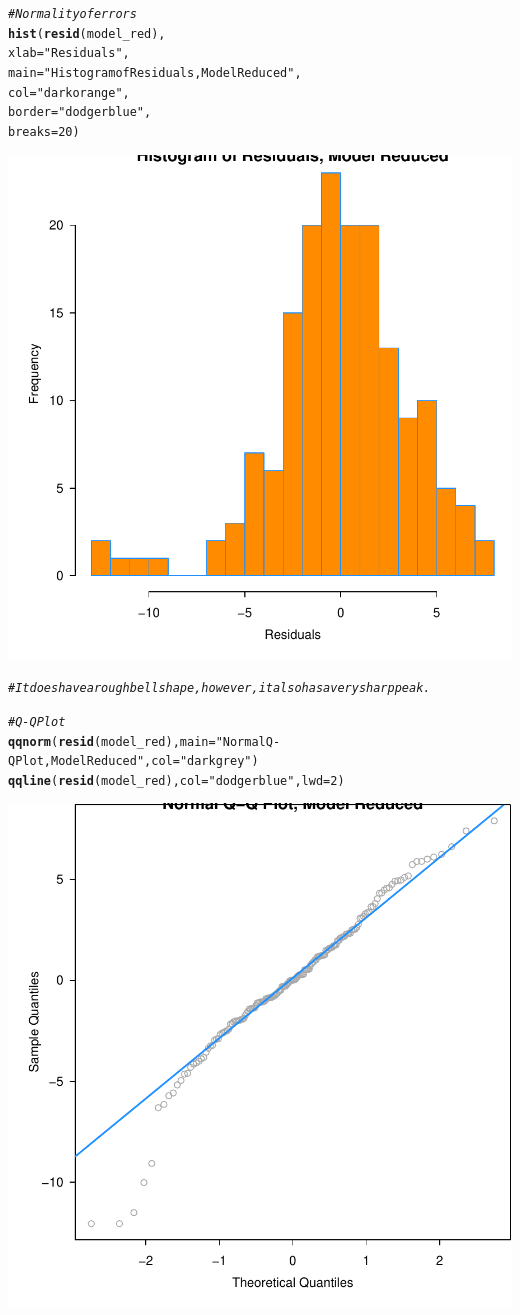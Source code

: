 \documentclass{article}\usepackage[]{graphicx}\usepackage[]{color}
\makeatletter
\newcommand{\hlnum}[1]{\textcolor[rgb]{0.686,0.059,0.569}{#1}}%
\newcommand{\hlstr}[1]{\textcolor[rgb]{0.192,0.494,0.8}{#1}}%
\newcommand{\hlcom}[1]{\textcolor[rgb]{0.678,0.584,0.686}{\textit{#1}}}%
\newcommand{\hlstd}[1]{\textcolor[rgb]{0.345,0.345,0.345}{#1}}%
\newcommand{\hlkwc}[1]{\textcolor[rgb]{0.333,0.667,0.333}{#1}}%
\newcommand{\hlkwd}[1]{\textcolor[rgb]{0.737,0.353,0.396}{\textbf{#1}}}%
\newenvironment{kframe}{%
 \def\at@end@of@kframe{}%
 \ifinner\ifhmode%
  \def\at@end@of@kframe{\end{minipage}}%
  \begin{minipage}{\columnwidth}%
 \fi\fi%
 \def\FrameCommand##1{\hskip\@totalleftmargin \hskip-\fboxsep
 \colorbox{shadecolor}{##1}\hskip-\fboxsep
     \hskip-\linewidth \hskip-\@totalleftmargin \hskip\columnwidth}%
 \MakeFramed {\advance\hsize-\width
   \@totalleftmargin\z@ \linewidth\hsize
   \@setminipage}}%
 {\par\unskip\endMakeFramed%
 \at@end@of@kframe}
\newenvironment{knitrout}{}{} %
\makeatother
\begin{document}
\begin{knitrout}
\begin{kframe}
\begin{alltt}
\hlcom{# Normality of errors}
\hlkwd{hist}\hlstd{(}\hlkwd{resid}\hlstd{(model_red),}
     \hlkwc{xlab}   \hlstd{=} \hlstr{"Residuals"}\hlstd{,}
     \hlkwc{main}   \hlstd{=} \hlstr{"Histogram of Residuals, Model Reduced"}\hlstd{,}
     \hlkwc{col}    \hlstd{=} \hlstr{"darkorange"}\hlstd{,}
     \hlkwc{border} \hlstd{=} \hlstr{"dodgerblue"}\hlstd{,}
     \hlkwc{breaks} \hlstd{=} \hlnum{20}\hlstd{)}
\end{alltt}
\end{kframe}

{\centering \includegraphics[width=.6\linewidth]{figure/Analysis-Rnwauto-report-25} 

}


\begin{kframe}\begin{alltt}
\hlcom{# It does have a rough bell shape, however, it also has a very sharp peak.}

\hlcom{# Q-Q Plot}
\hlkwd{qqnorm}\hlstd{(}\hlkwd{resid}\hlstd{(model_red),} \hlkwc{main} \hlstd{=} \hlstr{"Normal Q-Q Plot, Model Reduced"}\hlstd{,} \hlkwc{col} \hlstd{=} \hlstr{"darkgrey"}\hlstd{)}
\hlkwd{qqline}\hlstd{(}\hlkwd{resid}\hlstd{(model_red),} \hlkwc{col} \hlstd{=} \hlstr{"dodgerblue"}\hlstd{,} \hlkwc{lwd} \hlstd{=} \hlnum{2}\hlstd{)}
\end{alltt}
\end{kframe}

{\centering \includegraphics[width=.6\linewidth]{figure/Analysis-Rnwauto-report-26} 

}
\end{knitrout}
\end{document}
